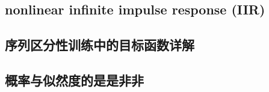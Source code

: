 \subsection{nonlinear infinite impulse response (IIR)}

\subsection{序列区分性训练中的目标函数详解}
\label{sub:sdt-obj}


\subsection{概率与似然度的是是非非}















